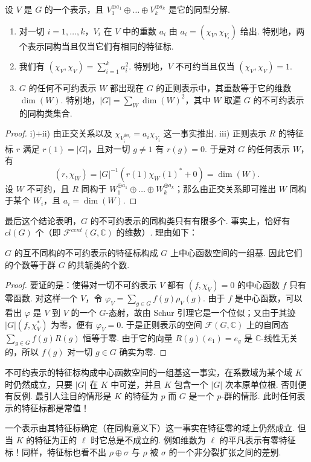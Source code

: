 \begin{corollary}\label{cor:fg-4-2-8}
设 $V$ 是 $G$ 的一个表示，且 $V_1^{\oplus a_1}\oplus\ldots\oplus V_k^{\oplus a_k}$ 是它的同型分解.
\begin{enumerate}[label=\roman*)]
\item 对一切 $i=1,\ldots,k$，$V_i$ 在 $V$ 中的重数 $a_i$ 由 $a_i=(\chi_V,\chi_{V_i})$ 给出. 特别地，两个表示同构当且仅当它们有相同的特征标.
\item 我们有 $(\chi_V,\chi_V)=\sum_{i=1}^k a_i^2$. 特别地，$V$ 不可约当且仅当 $(\chi_V,\chi_V)=1$.
\item $G$ 的任何不可约表示 $W$ 都出现在 $G$ 的正则表示中，其重数等于它的维数 $\dim(W)$. 特别地，$|G|=\sum_W\dim(W)^2$，其中 $W$ 取遍 $G$ 的不可约表示的同构类集合.
\end{enumerate}
\end{corollary}

\begin{proof}
i)$+$ii) 由正交关系以及 $\chi_{V_i^{\oplus a_i}}=a_i\chi_{V_i}$ 这一事实推出.
iii) 正则表示 $R$ 的特征标 $r$ 满足 $r(1)=|G|$，且对一切 $g\neq1$ 有 $r(g)=0$. 于是对 $G$ 的任何表示 $W$，有
\[
(r,\chi_W)=|G|^{-1}(r(1)\chi_W(1)^*+0)=\dim(W).
\]
设 $W$ 不可约，且 $R$ 同构于 $W_1^{\oplus a_1}\oplus\ldots\oplus W_k^{\oplus a_k}$；那么由正交关系即可推出 $W$ 同构于某个 $W_i$，且 $a_i=\dim(W)$.
\end{proof}

最后这个结论表明，$G$ 的不可约表示的同构类只有有限多个. 事实上，恰好有 $cl(G)$ 个（即 $\mathcal{F}^{cent}(G,\mathbb{C})$ 的维数）. 理由如下：

\begin{theorem}\label{thm:fg-4-2-9}
$G$ 的互不同构的不可约表示的特征标构成 $G$ 上中心函数空间的一组基. 因此它们的个数等于群 $G$ 的共轭类的个数.
\end{theorem}

\begin{proof}
要证的是：使得对一切不可约表示 $V$ 都有 $(f,\chi_V)=0$ 的中心函数 $f$ 只有零函数. 对这样一个 $V$，令 $\varphi_V=\sum_{g\in G}f(g)\rho_V(g)$. 由于 $f$ 是中心函数，可以看出 $\varphi$ 是 $V$ 到 $V$ 的一个 $G$-态射，故由 Schur 引理它是一个位似；又由于其迹 $|G|(f,\chi_V^*)$ 为零，便有 $\varphi_V=0$. 于是正则表示的空间 $\mathcal{F}(G,\mathbb{C})$ 上的自同态 $\sum_{g\in G}f(g)R(g)$ 恒等于零. 由于它的向量 $R(g)(e_1)=e_g$ 是 $\mathbb{C}$-线性无关的，所以 $f(g)$ 对一切 $g\in G$ 确实为零.
\end{proof}

\begin{remark}\label{rem:fg-4-2-10}
不可约表示的特征标构成中心函数空间的一组基这一事实，在系数域为某个域 $K$ 时仍然成立，只要 $|G|$ 在 $K$ 中可逆，并且 $K$ 包含一个 $|G|$ 次本原单位根. 否则便有反例. 最引人注目的情形是 $K$ 的特征为 $p$ 而 $G$ 是一个 $p$-群的情形. 此时任何表示的特征标都是常值！

一个表示由其特征标确定（在同构意义下）这一事实在特征零的域上仍然成立. 但当 $K$ 的特征为正的 $\ell$ 时它总是不成立的. 例如维数为 $\ell$ 的平凡表示有零特征标！同样，特征标也看不出 $\rho\oplus\sigma$ 与 $\rho$ 被 $\sigma$ 的一个非分裂扩张之间的差别.
\end{remark}

